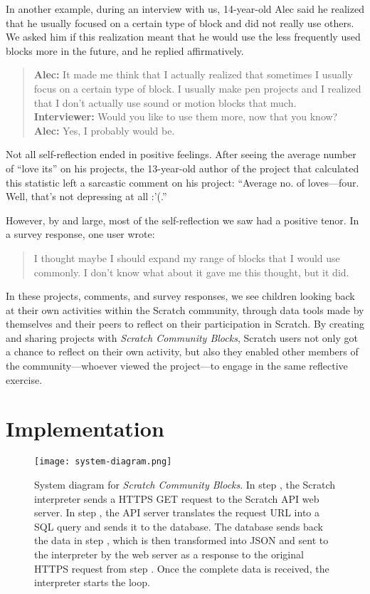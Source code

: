 \documentclass{sigchi}
\newcommand*\circled[1]{\tikz[baseline=(char.base)]{
  \node[shape=circle,draw,inner sep=1pt] (char) {#1};}}
\begin{document}
In another example, during an interview with us, 14-year-old Alec said he realized that he usually focused on a certain type of block and did not really use others. We asked him if this realization meant that he would use the less frequently used blocks more in the future, and he replied affirmatively.

\begin{quote}
\textbf{Alec:} It made me think that I actually realized that sometimes I usually focus on a certain type of block. I usually make pen projects and I realized that I don't actually use sound or motion blocks that much.\\
\textbf{Interviewer:} Would you like to use them more, now that you know?\\
\textbf{Alec:} Yes, I probably would be.\\
\end{quote}

Not all self-reflection ended in positive feelings. After seeing the average number of ``love its'' on his projects, the 13-year-old author of the project that calculated this statistic left a sarcastic comment on his project: ``Average no. of loves---four. Well, that's not depressing at all :'(.''

However, by and large, most of the self-reflection we saw had a positive tenor. In a survey response, one user wrote:

\begin{quote}
I thought maybe I should expand my range of blocks that I would use commonly. I don't know what about it gave me this thought, but it did.
\end{quote}

In these projects, comments, and survey responses, we see children looking back at their own activities within the Scratch community, through data tools made by themselves and their peers to reflect on their participation in Scratch. By creating and sharing projects with \emph{Scratch Community Blocks}, Scratch users not only got a chance to reflect on their own activity, but also they enabled other members of the community---whoever viewed the project---to engage in the same reflective exercise.

\section{Implementation}

\begin{figure*}[ht!]
\texttt{[image: system-diagram.png]}
\centering
\caption[System diagram for \emph{Scratch Community Blocks}]{System diagram for \emph{Scratch Community Blocks}. In step \circled{1}, the Scratch interpreter sends a HTTPS GET request to the Scratch API web server. In step \circled{2}, the API server translates the request URL into a SQL query and sends it to the database. The database sends back the data in step \circled{3}, which is then transformed into JSON and sent to the interpreter by the web server as a response to the original HTTPS request from step \circled{1}. Once the complete data is received, the interpreter starts the loop.}
\label{fig:system-diagram}
\end{figure*}
\end{document}
